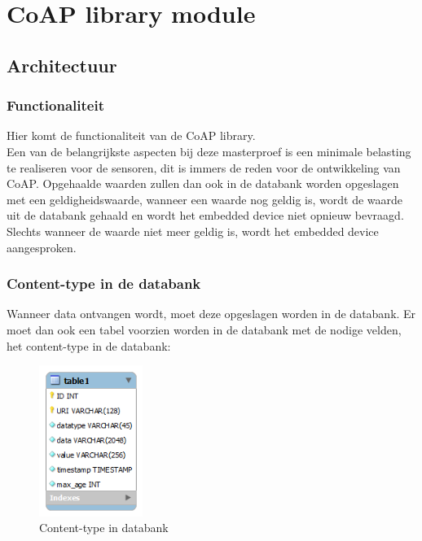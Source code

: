 \chapter{CoAP library module}

\section{Architectuur}

\subsection{Functionaliteit}

Hier komt de functionaliteit van de CoAP library.\\

Een van de belangrijkste aspecten bij deze masterproef is een minimale belasting te realiseren voor de sensoren, dit is immers de reden voor de ontwikkeling van CoAP. Opgehaalde waarden zullen dan ook in de databank worden opgeslagen met een geldigheidswaarde, wanneer een waarde nog geldig is, wordt de waarde uit de databank gehaald en wordt het embedded device niet opnieuw bevraagd. Slechts wanneer de waarde niet meer geldig is, wordt het embedded device aangesproken.\\

\subsection{Content-type in de databank}

Wanneer data ontvangen wordt, moet deze opgeslagen worden in de databank. Er moet dan ook een tabel voorzien worden in de databank met de nodige velden, het content-type in de databank:

\begin{figure}
\vspace{10pt}
\includegraphics[width=0.3\textwidth]{fig/contentTypeDatabank}
\vspace{-35pt}
\caption{Content-type in databank}
\vspace{-10pt}
\end{figure}
